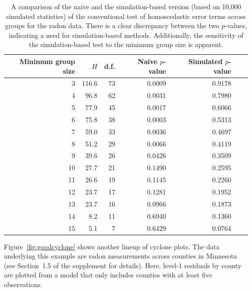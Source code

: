 \documentclass[12pt]{article}
\newcommand{\alnote}[1]{\todo[inline,color=green!40]{#1}} %
\newcommand{\hhnote}[1]{\todo[inline,color=orange!40]{#1}}
\begin{document}
%
%
\begin{table}[ht]
\caption{\label{tab:pvalues} A comparison of the naive and the simulation-based version (based on 10,000 simulated statistics) of the conventional test of homoscedastic error terms across groups for the radon data. There is a clear discrepancy between the two $p$-values, indicating a need for simulation-based methods. Additionally, the sensitivity of the simulation-based test to the minimum group size is apparent.} 
\centering
\begin{tabular}{rrrrrrr}
  \hline
 Minimum group size & $H$ & d.f. & Naive $p$-value  & Simulated $p$-value \\ 
  \hline
3 & 116.6 & 73 & 0.0009 & 0.9178 \\ 
  4 & 96.8 & 62 & 0.0031 & 0.7980 \\ 
  5 & 77.9 & 45 & 0.0017 & 0.6066 \\ 
  6 & 75.8 & 38 & 0.0003 & 0.5313 \\ 
  7 & 59.0 & 33 & 0.0036 & 0.4697 \\ 
  8 & 51.2 & 29 & 0.0066 & 0.4119 \\ 
  9 & 39.6 & 26 & 0.0426 & 0.3509 \\ 
  10 & 27.7 & 21 & 0.1490 & 0.2595 \\ 
  11 & 26.6 & 19 & 0.1145 & 0.2260 \\ 
  12 & 23.7 & 17 & 0.1281 & 0.1952 \\ 
  13 & 23.7 & 16 & 0.0966 & 0.1873 \\ 
  14 & 8.2 & 11 & 0.6940 & 0.1360 \\ 
  15 & 5.1 & 7 & 0.6429 & 0.0764 \\ 
   \hline
\end{tabular}
\end{table}
Figure~\ref{fig:goodcyclone} shows another lineup of cyclone plots.  The data underlying this example are radon measurements across counties in Minnesota (see Section~1.5 of the supplement for details).
Here, level-1 residuals by county are plotted from a model that only includes counties with at least five observations. 
\end{document}
